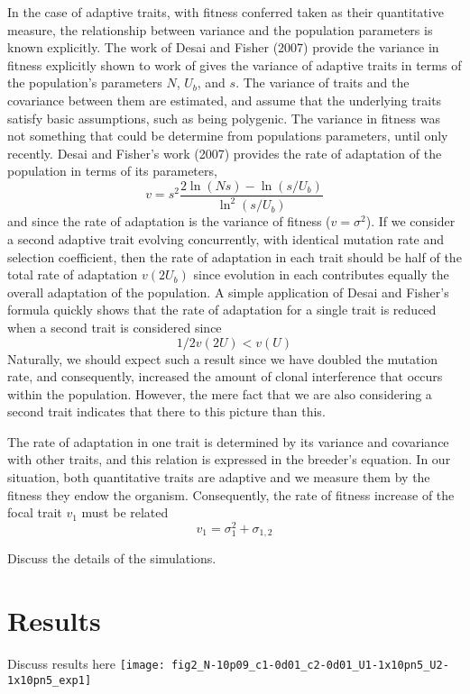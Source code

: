 \documentclass[11pt,one column]{article}
\begin{document}
\begin{multicols}{2}
In the case of adaptive traits, with fitness conferred taken as their quantitative measure, the relationship between variance and the population parameters is known explicitly. The work of Desai and Fisher (2007) provide the variance in fitness explicitly shown to work of gives the variance of adaptive traits in terms of the population’s parameters $N$, $U_b$, and $s$. The variance of traits and the covariance between them are estimated, and assume that the underlying traits satisfy basic assumptions, such as being polygenic. The variance in fitness was not something that could be determine from populations parameters, until only recently. Desai and Fisher’s work (2007) provides the rate of adaptation of the population in terms of its parameters,
\begin{equation} 
v =s^2  \frac{2 \ln(Ns)-\ln(s/U_b)}{\ln^2(s/U_b)}
\end{equation}  
and since the rate of adaptation is the variance of fitness ($v=\sigma^2$).  If we consider a second adaptive trait evolving concurrently, with identical mutation rate and selection coefficient, then the rate of adaptation in each trait should be half of the total rate of adaptation $v(2U_b)$ since evolution in each contributes equally the overall adaptation of the population. A simple application of Desai and Fisher’s formula quickly shows that the rate of adaptation for a single trait is reduced when a second trait is considered since
\[ 1/2  v(2U)<v(U) \]
Naturally, we should expect such a result since we have doubled the mutation rate, and consequently, increased the amount of clonal interference that occurs within the population. However, the mere fact that we are also considering a second trait indicates that there to this picture than this.\par

The rate of adaptation in one trait is determined by its variance and covariance with other traits, and this relation is expressed in the breeder’s equation. In our situation, both quantitative traits are adaptive and we measure them by the fitness they endow the organism. Consequently, the rate of fitness increase of the focal trait $v_1$ must be related
\begin{equation}
v_1=\sigma_1^2+\sigma_{1,2}
\end{equation}

Discuss the details of the simulations.

\section*{Results}
Discuss results here
{\centering
\texttt{[image: fig2\_N-10p09\_c1-0d01\_c2-0d01\_U1-1x10pn5\_U2-1x10pn5\_exp1]}
 \label{fig.1}}


\end{multicols}
\end{document}

